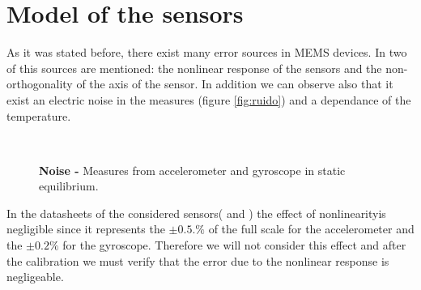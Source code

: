\documentclass[conference]{IEEEtran}
\begin{document}
\section{Model of the sensors}
\label{sec:modelo}

As it was stated before, there exist many error sources in MEMS devices. In \cite{bib:calib_imu} two of this sources are mentioned: the nonlinear response of the sensors and the non-orthogonality of the axis of the sensor. In addition we can observe also that it exist an electric noise in the measures (figure \ref{fig:ruido}) and a dependance of the temperature.\\
\vspace{-10pt}
\begin{figure}[h!]
  \centering
  \\[-5pt]
  			\vspace{-5pt}
  \caption{\textbf{Noise -} Measures from accelerometer and gyroscope in static equilibrium.}
  \label{fig:noise}
\end{figure}

In the datasheets of the considered sensors(\cite{bib:acc_data} and \cite{bib:gyro_data}) the effect of nonlinearityis negligible since it represents the $\pm 0.5.\%$  of the full scale for the accelerometer and the $\pm 0.2\%$ for the gyroscope. Therefore we will not consider this effect and after the calibration we must verify that the error due to the nonlinear response is negligeable.\\
\end{document}
